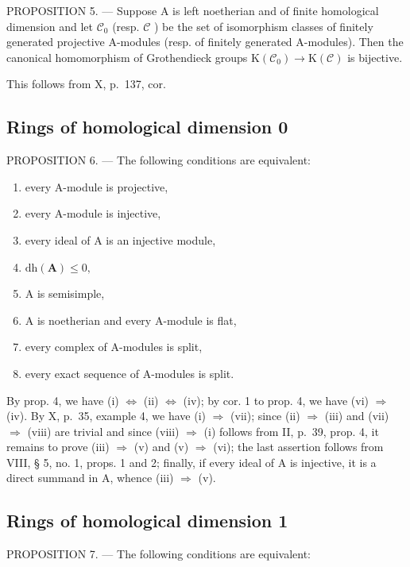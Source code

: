 PROPOSITION 5. --- Suppose A is left noetherian and of finite homological dimension and let \(\mathcal{C}_{0}\) (resp. \(\mathcal{C}\) ) be the set of isomorphism classes of finitely generated projective A-modules (resp. of finitely generated A-modules). Then the canonical homomorphism of Grothendieck groups \(\mathrm{K}(\mathcal{C}_{0}) \to \mathrm{K}(\mathcal{C})\) is bijective.

This follows from X, p.~137, cor.

\subsection{Rings of homological dimension 0}

PROPOSITION 6. --- The following conditions are equivalent:

\begin{enumerate}
\def\labelenumi{(\roman{enumi})}
\item
  every A-module is projective,
\item
  every A-module is injective,
\item
  every ideal of A is an injective module,
\item
  \(\mathrm{dh}(\mathbf{A})\leqslant 0,\)
\item
  A is semisimple,
\item
  A is noetherian and every A-module is flat,
\item
  every complex of A-modules is split,
\item
  every exact sequence of A-modules is split.
\end{enumerate}

By prop. 4, we have (i) \(\Leftrightarrow\) (ii) \(\Leftrightarrow\) (iv); by cor. 1 to prop. 4, we have (vi) \(\Rightarrow\) (iv). By X, p.~35, example 4, we have (i) \(\Rightarrow\) (vii); since (ii) \(\Rightarrow\) (iii) and (vii) \(\Rightarrow\) (viii) are trivial and since (viii) \(\Rightarrow\) (i) follows from II, p.~39, prop. 4, it remains to prove (iii) \(\Rightarrow\) (v) and (v) \(\Rightarrow\) (vi); the last assertion follows from VIII, § 5, no. 1, props. 1 and 2; finally, if every ideal of A is injective, it is a direct summand in A, whence (iii) \(\Rightarrow\) (v).

\subsection{Rings of homological dimension 1}

PROPOSITION 7. --- The following conditions are equivalent:

